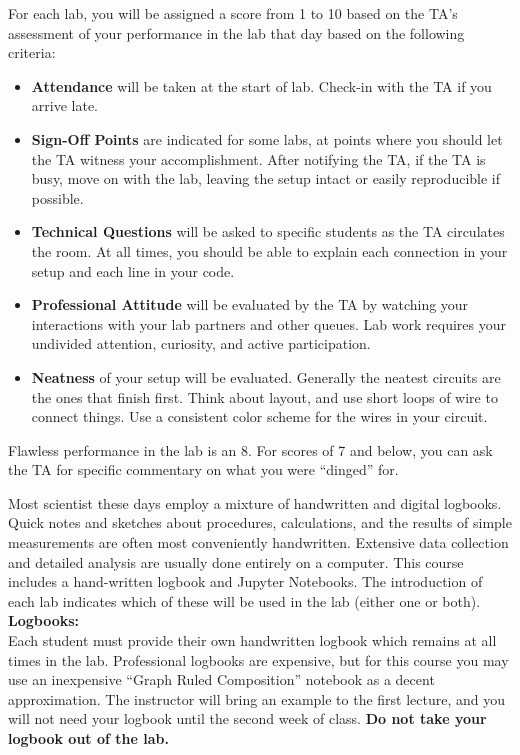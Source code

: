 \documentclass[12pt]{article}
\begin{document}
For each lab,  you will be assigned a score from 1 to 10 based on the TA's assessment
of your performance in the lab that day based on the following
criteria:
\begin{itemize}
\item {\bf Attendance} will be taken at the start of lab. Check-in
  with the TA if you arrive late.
\item {\bf Sign-Off Points} are indicated for some labs, at points where you should let the TA witness your accomplishment.  After notifying the TA, if the TA is busy, move on with the lab, leaving the setup intact or easily reproducible if possible.
\item {\bf Technical Questions} will be asked to specific students as the TA circulates the room.  At all times, you should be able to explain each connection in your setup and each line in your code.
\item {\bf Professional Attitude} will be evaluated by the TA by watching your interactions with your lab partners and other queues.  Lab work requires your undivided attention, curiosity, and active participation.
\item {\bf Neatness} of your setup will be evaluated.  Generally the neatest circuits are the ones that finish first.  Think about layout, and use short loops of wire to connect things.  Use a consistent color scheme for the wires in your circuit.
 \end{itemize}
Flawless performance in the lab is an 8.  For scores of 7 and
below, you can ask the TA for specific commentary on what you were
``dinged'' for.

Most scientist these days employ a mixture of handwritten and digital logbooks.  Quick notes and sketches about procedures, calculations, and the results of simple measurements are often most conveniently handwritten.  Extensive data collection and detailed analysis are usually done entirely on a computer.  This course includes a hand-written logbook and Jupyter Notebooks.  The introduction of each lab indicates which of these will be used in the lab (either one or both).\\

\noindent
\textbf {Logbooks:}\\ 
Each student must provide their own handwritten logbook which remains at all
times in the lab.  Professional logbooks are expensive, but for this
course you may use an inexpensive ``Graph Ruled Composition'' notebook
as a decent approximation.  The instructor will bring an example to the first lecture, and
you will not need your logbook until the second week of class.  {\bf Do not take your logbook out of the lab.}\\
\end{document}
